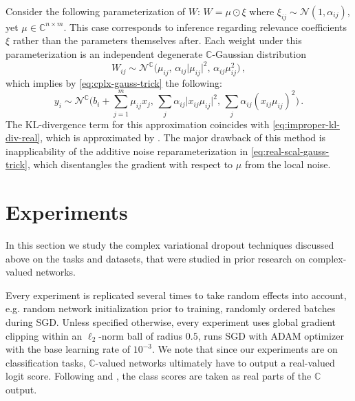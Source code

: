 \documentclass[a4paper,10pt]{article}
\newcommand{\cplx}{\mathbb{C}}
\begin{document}
Consider the following parameterization of $W$: $
  W = \mu \odot \xi
$ where $
  \xi_{ij} \sim \mathcal{N}(1, \alpha_{ij})
$, yet $\mu \in \cplx^{n \times m}$. This case corresponds to inference regarding
relevance coefficients $\xi$ rather than the parameters themselves after. Each weight
under this parameterization is an independent degenerate $\cplx$-Gaussian distribution
\begin{equation}  \label{eq:real-scal-gauss-vi}
  W_{ij}
    \sim \mathcal{N}^{\cplx} \bigl(
      \mu_{ij},
      \, \alpha_{ij} \lvert \mu_{ij} \rvert^2,
      \, \alpha_{ij} \mu_{ij}^2
    \bigr)
  \,,
\end{equation}
which implies by \eqref{eq:cplx-gauss-trick} the following:
\begin{equation}  \label{eq:real-scal-gauss-trick}
  y_i
    \sim \mathcal{N}^{\cplx}\bigl(
      b_i + \sum_{j=1}^m \mu_{ij} x_j,
      \, \sum_j \alpha_{ij} \lvert x_{ij} \mu_{ij}\rvert^2,
      \, \sum_j \alpha_{ij} (x_{ij} \mu_{ij})^2
    \bigr)
    \,.
\end{equation}
The KL-divergence term for this approximation coincides with \eqref{eq:improper-kl-div-real},
which is approximated by \citet{molchanov_variational_2017}. The major drawback of this method
is inapplicability of the additive noise reparameterization in \eqref{eq:real-scal-gauss-trick},
which disentangles the gradient with respect to $\mu$ from the local noise.





\section{Experiments} %
\label{sec:experiments}

In this section we study the complex variational dropout techniques discussed above
on the tasks and datasets, that were studied in prior research on complex-valued networks.

Every experiment is replicated several times to take random effects into account, e.g.
random network initialization prior to training, randomly ordered batches during SGD.
Unless specified otherwise, every experiment uses global gradient clipping within an
$\ell_2$-norm ball of radius $0.5$, runs SGD with ADAM optimizer with the base learning
rate of $10^{-3}$. We note that since our experiments are on classification tasks,
$\cplx$-valued networks ultimately have to output a real-valued logit score. Following
\citet{wolter_complex_2018} and \citet{trabelsi_deep_2017}, the class scores are taken
as real parts of the $\cplx$ output.
\end{document}
